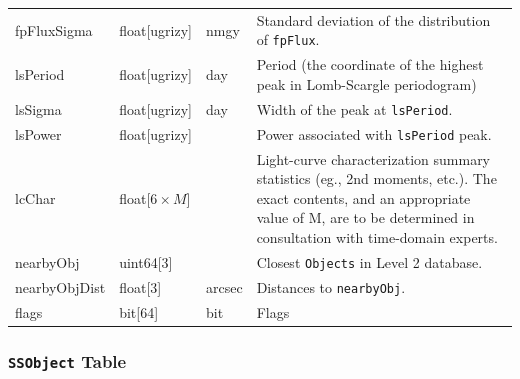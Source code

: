 \documentclass[12pt]{article}
\newcommand{\code}[1]{\texttt{#1}}
\newcommand{\DR}{{Level 2 database}\xspace}
\newcommand{\Objects}{\code{Objects}\xspace}
\newcommand{\SSObject}{\code{SSObject}\xspace}
\begin{document}
\begin{center}
\begin{longtable}{p{3cm}p{2cm}p{2cm}p{5cm}}
fpFluxSigma & float[ugrizy] & nmgy & Standard deviation of the distribution of {\tt fpFlux}. \\ 

lsPeriod  & float[ugrizy] & day & Period (the coordinate of the highest peak in Lomb-Scargle periodogram) \\

lsSigma  & float[ugrizy] & day & Width of the peak at \texttt{lsPeriod}. \\

lsPower   & float[ugrizy] & ~ & Power associated with \texttt{lsPeriod} peak. \\

lcChar   & float[$6\times{}M$] & ~ & Light-curve characterization summary statistics (eg., 2nd moments, etc.). The exact contents, and an appropriate value of M, are to be determined in consultation with time-domain experts. \\

nearbyObj   & uint64[3] & ~ & Closest \Objects in \DR. \\

nearbyObjDist   & float[3] & arcsec & Distances to \texttt{nearbyObj}. \\

flags & bit[64] & bit & Flags \\ \hline

\end{longtable}
\end{center}

\subsubsection{\SSObject Table}
\end{document}
